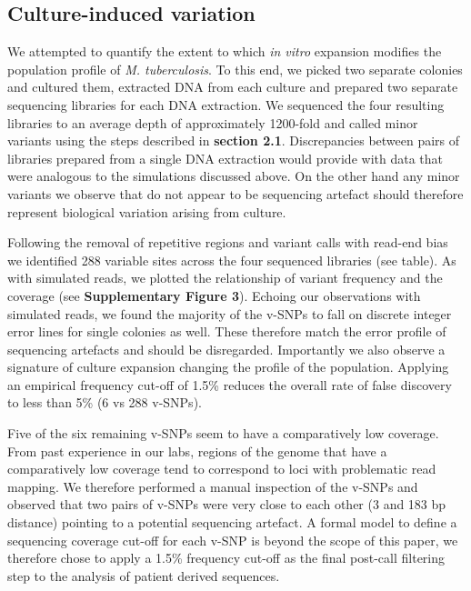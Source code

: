 \documentclass[12pt, oneside]{article}   	%
\begin{document}
\subsection{Culture-induced variation}
We attempted to quantify the extent to which \textsl{in vitro} expansion modifies the population profile of \textsl{M. tuberculosis}. To this end, we picked two separate colonies and cultured them, extracted DNA from each culture and prepared two separate sequencing libraries for each DNA extraction. We sequenced the four resulting libraries to an average depth of approximately 1200-fold and called minor variants using the steps described in \textbf{section 2.1}. Discrepancies between pairs of libraries prepared from a single DNA extraction would provide with data that were analogous to the simulations discussed above. On the other hand any minor variants we observe that do not appear to be sequencing artefact should therefore represent biological variation arising from culture.

Following the removal of repetitive regions and variant calls with read-end bias we identified 288 variable sites across the four sequenced libraries (see table). As with simulated reads, we plotted the relationship of variant frequency and the coverage (see \textbf{Supplementary Figure 3}). Echoing our observations with simulated reads, we found the majority of the v-SNPs to fall on discrete integer error lines for single colonies as well. These therefore match the error profile of sequencing artefacts and should be disregarded. Importantly we also observe a signature of culture expansion changing the profile of the population. Applying an empirical frequency cut-off of 1.5\% reduces the overall rate of false discovery to less than 5\% (6 vs 288 v-SNPs).

Five of the six remaining v-SNPs seem to have a comparatively low coverage. From past experience in our labs, regions of the genome that have a comparatively low coverage tend to correspond to loci with problematic read mapping. We therefore performed a manual inspection of the v-SNPs and observed that two pairs of v-SNPs were very close to each other (3 and 183 bp distance) pointing to a potential sequencing artefact. A formal model to define a sequencing coverage cut-off for each v-SNP is beyond the scope of this paper, we therefore chose to apply a 1.5\% frequency cut-off as the final post-call filtering step to the analysis of patient derived sequences.
\end{document}
